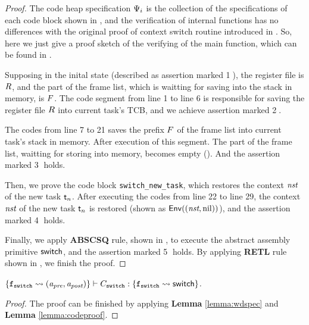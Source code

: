 \begin{proof}
    The code heap specification $\Psi_i$ is the collection of 
    the specifications of each code block shown in 
    \Fig{\ref{fig:Specifications of Internal Functions}}, and 
    the verification of internal functions has no differences with 
    the original proof of context switch routine introduced in 
    \Sec{\ref{sec:ctxswitch}}. So, here we just give a proof sketch 
    of the verifying of the main function, which can be found in 
    \Fig{\ref{fig:Proof Sketch of the Context Switch Routine}}. 

    Supposing in the inital state (described as assertion marked 
    {\color{red} \textcircled{1}}), 
    the register file is $R$, 
    and the part of the frame list, which is waitting for saving into 
    the stack in memory, is $F$. The code segment 
    from line 1 to line 6 is responsible for saving the register file  
    $R$ into current task's TCB, and we achieve assertion 
    marked {\color{red} \textcircled{2}}. 

    The codes from line 7 to 21 saves the prefix $F$ of the 
    frame list into current task's stack in memory. After execution 
    of this segment. The part of the frame list, waitting for storing 
    into memory, becomes empty (\nil). And the assertion marked
    {\color{red} \textcircled{3}} holds.  

    Then, we prove the code block \texttt{switch\_new\_task}, which 
    restores the context $\textit{nst}$ of the new task $\textsf{t}_n$. After 
    executing the codes from line 22 to line 29, the context $\textit{nst}$ of 
    the new task $\textsf{t}_n$ is restored (shown as $\mathsf{Env}({(\textit{nst}, \text{nil})})$), 
    and the assertion marked {\color{red} \textcircled{4}} holds. 

    Finally, we apply \textbf{ABSCSQ} rule, shown in 
    \Fig{\ref{fig:Selected Inference Rules for Refinement Verification}}, 
    to execute the abstract assembly primitive $\mathsf{switch}{}$, and the 
    assertion marked {\color{red} \textcircled{5}} holds. 
    By applying \textbf{RETL} rule shown in 
    \Fig{\ref{fig:Selected Inference Rules for Refinement Verification}}, 
    we finish the proof. 
\end{proof}

\begin{theorem}
    \em
    ${\{ \texttt{f}_{\texttt{switch}} \rightsquigarrow 
        (\textit{a}_\textit{pre}, \textit{a}_\textit{post}) \}} \vdash {C_{\texttt{switch}}} : {\{\texttt{f}_{\texttt{switch}}\rightsquigarrow \mathsf{switch}\}}$. 
\end{theorem}
\begin{proof}
    The proof can be finished by applying 
    \textbf{Lemma} \ref{lemma:wdspec} and 
    \textbf{Lemma} \ref{lemma:codeproof}.
\end{proof}

